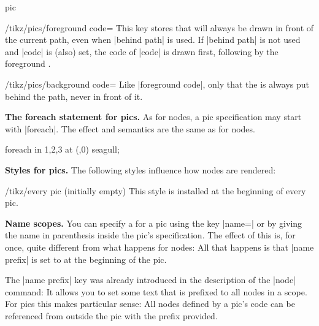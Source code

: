 \begin{pathoperation}{pic}
    \begin{key}{/tikz/pics/foreground code=}
        This key stores  that will always be drawn in front of the
        current path, even when |behind path| is used. If |behind path| is not
        used and |code| is (also) set, the code of |code| is drawn first,
        following by the foreground .
    \end{key}

    \begin{key}{/tikz/pics/background code=}
        Like |foreground code|, only that the  is always put behind
        the path, never in front of it.
    \end{key}

    \medskip
    \textbf{The foreach statement for pics.}
    As for nodes, a pic specification may start with |foreach|. The effect and
    semantics are the same as for nodes.
\begin{codeexample}[]
\tikz \pic foreach \x in {1,2,3} at (\x,0) {seagull};
\end{codeexample}

    \medskip
    \textbf{Styles for pics.}
    The following styles influence how nodes are rendered:
    \begin{stylekey}{/tikz/every pic (initially \normalfont empty)}
        This style is installed at the beginning of every pic.
\begin{codeexample}[]
\end{codeexample}
    \end{stylekey}

    \medskip
    \textbf{Name scopes.}
    You can specify a  for a pic using the key |name=| or
    by giving the name in parenthesis inside the pic's specification. The
    effect of this is, for once, quite different from what happens for nodes:
    All that happens is that |name prefix| is set to  at the
    beginning of the pic.

    The |name prefix| key was already introduced in the description of the
    |node| command: It allows you to set some text that is prefixed to all
    nodes in a scope. For pics this makes particular sense: All nodes defined
    by a pic's code can be referenced from outside the pic with the prefix
    provided.


\end{pathoperation}
